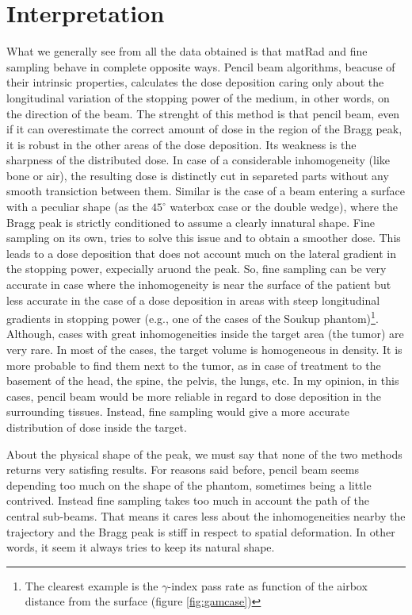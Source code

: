 \documentclass[12pt, a4paper, twoside]{book}
\begin{document}
\section{Interpretation}
What we generally see from all the data obtained is that matRad and fine sampling behave in complete opposite ways. Pencil beam algorithms, beacuse of their intrinsic properties, calculates the dose deposition caring only about the longitudinal variation of the stopping power of the medium, in other words, on the direction of the beam. The strenght of this method is that pencil beam, even if it can overestimate the correct amount of dose in the region of the Bragg peak, it is robust in the other areas of the dose deposition. Its weakness is the sharpness of the distributed dose. In case of a considerable inhomogeneity (like bone or air), the resulting dose is distinctly cut in separeted parts without any smooth transiction between them. Similar is the case of a beam entering a surface with a peculiar shape (as the $45^\circ$ waterbox case or the double wedge), where the Bragg peak is strictly conditioned to assume a clearly innatural shape.
Fine sampling on its own, tries to solve this issue and to obtain a smoother dose. This leads to a dose deposition that does not account much on the lateral gradient in the stopping power, expecially aruond the peak.
So, fine sampling can be very accurate in case where the inhomogeneity is near the surface of the patient but less accurate in the case of a dose deposition in areas with steep longitudinal gradients in stopping power (e.g., one of the cases of the Soukup phantom)\footnote{The clearest example is the $\gamma$-index pass rate as function of the airbox distance from the surface (figure \ref{fig:gamcase})}. Although, cases with great inhomogeneities inside the target area (the tumor) are very rare. In most of the cases, the target volume is homogeneous in density. It is more probable to find them next to the tumor, as in case of treatment to the basement of the head, the spine, the pelvis, the lungs, etc. In my opinion, in this cases, pencil beam would be more reliable in regard to dose deposition in the surrounding tissues. Instead, fine sampling would give a more accurate distribution of dose inside the target.

About the physical shape of the peak, we must say that none of the two methods returns very satisfing results. For reasons said before, pencil beam seems depending too much on the shape of the phantom, sometimes being a little contrived. Instead fine sampling takes too much in account the path of the central sub-beams. That means it cares less about the inhomogeneities nearby the trajectory and the Bragg peak is stiff in respect to spatial deformation. In other words, it seem it always tries to keep its natural shape.
\end{document}
